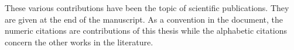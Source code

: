 These various contributions have been the topic of scientific publications. They
are given at the end of the manuscript. As a convention in the document, the
numeric citations are contributions of this thesis while the alphabetic
citations concern the other works in the literature.









